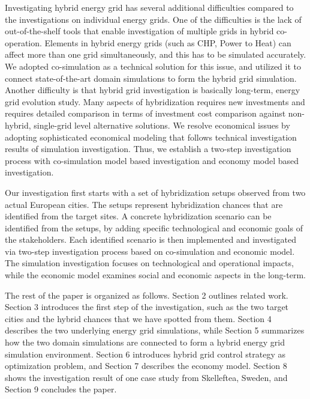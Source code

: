 \documentclass[review]{elsarticle}
\begin{document}
Investigating hybrid energy grid has several additional difficulties
compared to the investigations on individual energy grids. One of
the difficulties is the lack of out-of-the-shelf tools that enable
investigation of  multiple grids in hybrid co-operation. Elements in
hybrid energy grids (such as CHP, Power to Heat) can affect more than
one grid simultaneously, and this has to be simulated accurately. We
adopted co-simulation as a technical solution for this issue, and
utilized it to connect state-of-the-art domain simulations to form the
hybrid grid simulation. Another difficulty is that hybrid grid
investigation is basically long-term, energy grid evolution
study. Many aspects of hybridization requires new investments and
requires detailed comparison in terms of investment cost comparison
against non-hybrid, single-grid level alternative solutions. We
resolve economical issues by adopting sophisticated economical
modeling that follows technical investigation results of simulation
investigation. Thus, we establish a two-step investigation process
with co-simulation model based investigation and economy model based
investigation. 

Our investigation first starts with a set of hybridization setups
observed from two actual European cities. The setups represent
hybridization chances that are identified from the target sites. 
A concrete hybridization scenario can be identified from the setups,
by adding specific technological and economic goals of the
stakeholders. Each identified scenario is then implemented and
investigated via two-step investigation process based on
co-simulation and economic model. The simulation investigation 
focuses on technological and operational impacts, while the
economic model examines social and economic aspects in the
long-term. 


The rest of the paper is organized as follows. Section 2 outlines
related work. Section 3 introduces the first step of the
investigation, such as the two target cities and the hybrid chances
that we have spotted from them. Section 4 describes the two
underlying energy grid simulations, while Section 5 summarizes how the
two domain simulations are connected to form a hybrid energy grid
simulation environment. Section 6 introduces hybrid grid control
strategy as optimization problem, and Section 7 describes the economy
model. Section 8 shows the investigation result of one case
study from Skelleftea, Sweden, and Section 9 concludes the paper. 
\end{document}
